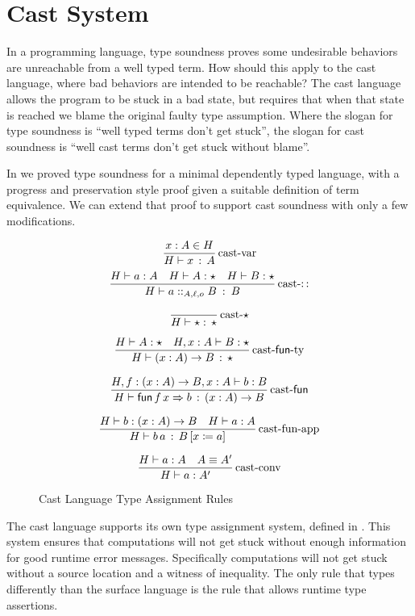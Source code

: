 \section{Cast System}
 
In a programming language, type soundness proves some undesirable behaviors are unreachable from a well typed term.
How should this apply to the cast language, where bad behaviors are intended to be reachable?
The cast language allows the program to be stuck in a bad state, but requires that when that state is reached we blame the original faulty type assumption.
Where the slogan for type soundness is ``well typed terms don't get stuck'', the slogan for cast soundness is ``well cast terms don't get stuck without blame''.
 
In  we proved type soundness for a minimal dependently typed language, with a progress and preservation style proof given a suitable definition of term equivalence.
We can extend that proof to support cast soundness with only a few modifications.
 
\begin{figure}
\[
\frac{x:A\in H}{H\vdash x\,:\,A}
\operatorname{cast-var}
\]
\[
\frac{H\vdash a:A\quad H\vdash A:\star\quad H\vdash B:\star}{H\vdash a::_{A,\ell ,o}B\::\:B}
\operatorname{cast-::}
\]
 
\[
\frac{\,}{H\vdash\star:\,\star}
\operatorname{cast-\star}
\]
 
\[
\frac{H\vdash A:\star\quad H,x:A\vdash B:\star}{H\vdash\left(x:A\right)\rightarrow B\,:\,\star}
\operatorname{cast-\mathsf{fun}-ty}
\]
 
\[
\frac{H,f:\left(x:A\right)\rightarrow B,x:A\vdash b:B}{H\vdash\mathsf{fun}\,f\,x\Rightarrow b\,:\,\left(x:A\right)\rightarrow B}
\operatorname{cast-\mathsf{fun}}
\]
 
\[
\frac{H\vdash b:\left(x:A\right)\rightarrow B\quad H\vdash a:A}{H\vdash b\,a\,:\,B\left[x\coloneqq a\right]}
\operatorname{cast-fun-app}
\]
 
\[
\frac{H\vdash a:A\quad A\equiv A'}{H\vdash a:A'}
\operatorname{cast-conv}
\]
 
 
\caption{Cast Language Type Assignment Rules}
\label{fig:cast-tas-rules}
\end{figure}
 
The cast language supports its own type assignment system, defined in .
This system ensures that computations will not get stuck without enough information for good runtime error messages.
Specifically computations will not get stuck without a source location and a witness of inequality.
The only rule that types differently than the surface language is the  rule that allows runtime type assertions.
 
